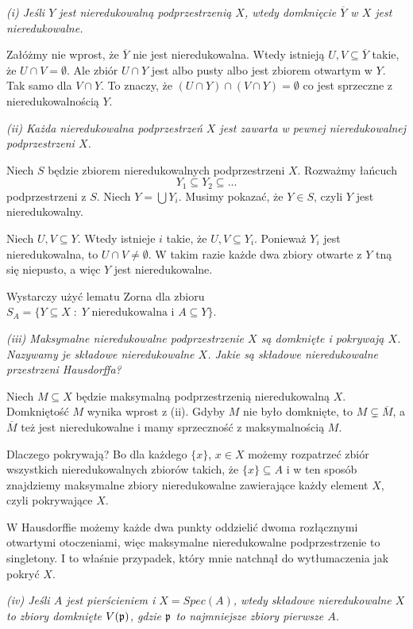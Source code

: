 \documentclass{article}
\begin{document}
\emph{\color{pink}(i) Jeśli $Y$ jest nieredukowalną podprzestrzenią $X$, wtedy domknięcie $\overline Y$ w $X$ jest nieredukowalne.}

Załóżmy nie wprost, że $\overline Y$ nie jest nieredukowalna. Wtedy istnieją $U, V\subseteq \overline Y$ takie, że $U\cap V=\emptyset$. Ale zbiór $U\cap Y$ jest albo pusty albo jest zbiorem otwartym w $Y$. Tak samo dla $V\cap Y$. To znaczy, że $(U\cap Y)\cap(V\cap Y)=\emptyset$ co jest sprzeczne z nieredukowalnością $Y$.

\emph{\color{pink}(ii) Każda nieredukowalna podprzestrzeń $X$ jest zawarta w pewnej nieredukowalnej podprzestrzeni $X$.}

Niech $S$ będzie zbiorem nieredukowalnych podprzestrzeni $X$. Rozważmy łańcuch
$$Y_1\subseteq Y_2\subseteq...$$
podprzestrzeni z $S$. Niech $Y=\bigcup Y_i$. Musimy pokazać, że $Y\in S$, czyli $Y$ jest nieredukowalny.

Niech $U,V\subseteq Y$. Wtedy istnieje $i$ takie, że $U,V\subseteq Y_i$. Ponieważ $Y_i$ jest nieredukowalna, to $U\cap V\neq\emptyset$. W takim razie każde dwa zbiory otwarte z $Y$ tną się niepusto, a więc $Y$ jest nieredukowalne.

Wystarczy użyć lematu Zorna dla zbioru $S_A=\{Y\subseteq X\;:\;Y\text{ nieredukowalna i }A\subseteq Y\}$.

\emph{\color{pink}(iii) Maksymalne nieredukowalne podprzestrzenie $X$ są domknięte i pokrywają $X$. Nazywamy je składowe nieredukowalne $X$. Jakie są składowe nieredukowalne przestrzeni Hausdorffa?}

Niech $M\subseteq X$ będzie maksymalną podprzestrzenią nieredukowalną $X$. Domkniętość $M$ wynika wprost z (ii). Gdyby $M$ nie było domknięte, to $M\subsetneq\overline M$, a $\overline M$ też jest nieredukowalne i mamy sprzeczność z maksymalnością $M$.

Dlaczego pokrywają? Bo dla każdego $\{x\}$, $x\in X$ możemy rozpatrzeć zbiór wszystkich nieredukowalnych zbiorów takich, że $\{x\}\subseteq A$ i w ten sposób znajdziemy maksymalne zbiory nieredukowalne zawierające każdy element $X$, czyli pokrywające $X$.

W Hausdorffie możemy każde dwa punkty oddzielić dwoma rozłącznymi otwartymi otoczeniami, więc maksymalne nieredukowalne podprzestrzenie to singletony. I to właśnie przypadek, który mnie natchnął do wytłumaczenia jak pokryć $X$.

\emph{\color{yellow}(iv) Jeśli $A$ jest pierścieniem i $X=Spec(A)$, wtedy składowe nieredukowalne $X$ to zbiory domknięte $V(\mathfrak{p})$, gdzie $\mathfrak{p}$ to najmniejsze zbiory pierwsze $A$.}
\end{document}
